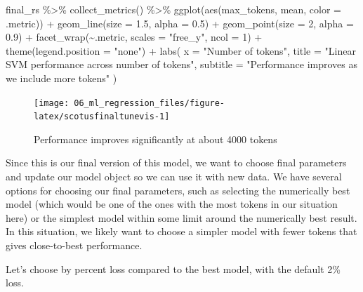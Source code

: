 \documentclass[
]{krantz}
\makeatletter
\newenvironment{Shaded}{\begin{snugshade}}{\end{snugshade}}
\newcommand{\AttributeTok}[1]{\textcolor[rgb]{0.77,0.63,0.00}{#1}}
\newcommand{\DecValTok}[1]{\textcolor[rgb]{0.00,0.00,0.81}{#1}}
\newcommand{\FloatTok}[1]{\textcolor[rgb]{0.00,0.00,0.81}{#1}}
\newcommand{\FunctionTok}[1]{\textcolor[rgb]{0.00,0.00,0.00}{#1}}
\newcommand{\NormalTok}[1]{#1}
\newcommand{\SpecialCharTok}[1]{\textcolor[rgb]{0.00,0.00,0.00}{#1}}
\newcommand{\StringTok}[1]{\textcolor[rgb]{0.31,0.60,0.02}{#1}}
\newenvironment{kframe}{%
\medskip{}
\setlength{\fboxsep}{.8em}
 \def\at@end@of@kframe{}%
 \ifinner\ifhmode%
  \def\at@end@of@kframe{\end{minipage}}%
  \begin{minipage}{\columnwidth}%
 \fi\fi%
 \def\FrameCommand##1{\hskip\@totalleftmargin \hskip-\fboxsep
 \colorbox{shadecolor}{##1}\hskip-\fboxsep
     \hskip-\linewidth \hskip-\@totalleftmargin \hskip\columnwidth}%
 \MakeFramed {\advance\hsize-\width
   \@totalleftmargin\z@ \linewidth\hsize
   \@setminipage}}%
 {\par\unskip\endMakeFramed%
 \at@end@of@kframe}
\renewenvironment{Shaded}{\begin{kframe}}{\end{kframe}}
\makeatother
\begin{document}
\begin{Shaded}
\begin{Highlighting}[]
\NormalTok{final\_rs }\SpecialCharTok{\%\textgreater{}\%}
  \FunctionTok{collect\_metrics}\NormalTok{() }\SpecialCharTok{\%\textgreater{}\%}
  \FunctionTok{ggplot}\NormalTok{(}\FunctionTok{aes}\NormalTok{(max\_tokens, mean, }\AttributeTok{color =}\NormalTok{ .metric)) }\SpecialCharTok{+}
  \FunctionTok{geom\_line}\NormalTok{(}\AttributeTok{size =} \FloatTok{1.5}\NormalTok{, }\AttributeTok{alpha =} \FloatTok{0.5}\NormalTok{) }\SpecialCharTok{+}
  \FunctionTok{geom\_point}\NormalTok{(}\AttributeTok{size =} \DecValTok{2}\NormalTok{, }\AttributeTok{alpha =} \FloatTok{0.9}\NormalTok{) }\SpecialCharTok{+}
  \FunctionTok{facet\_wrap}\NormalTok{(}\SpecialCharTok{\textasciitilde{}}\NormalTok{.metric, }\AttributeTok{scales =} \StringTok{"free\_y"}\NormalTok{, }\AttributeTok{ncol =} \DecValTok{1}\NormalTok{) }\SpecialCharTok{+}
  \FunctionTok{theme}\NormalTok{(}\AttributeTok{legend.position =} \StringTok{"none"}\NormalTok{) }\SpecialCharTok{+}
  \FunctionTok{labs}\NormalTok{(}
    \AttributeTok{x =} \StringTok{"Number of tokens"}\NormalTok{,}
    \AttributeTok{title =} \StringTok{"Linear SVM performance across number of tokens"}\NormalTok{,}
    \AttributeTok{subtitle =} \StringTok{"Performance improves as we include more tokens"}
\NormalTok{  )}
\end{Highlighting}
\end{Shaded}

\begin{figure}

{\centering \texttt{[image: 06\_ml\_regression\_files/figure-latex/scotusfinaltunevis-1]} 

}

\caption{Performance improves significantly at about 4000 tokens}\label{fig:scotusfinaltunevis}
\end{figure}

Since this is our final version of this model, we want to choose final parameters and update our model object so we can use it with new data. We have several options for choosing our final parameters, such as selecting the numerically best model (which would be one of the ones with the most tokens in our situation here) or the simplest model within some limit around the numerically best result. In this situation, we likely want to choose a simpler model with fewer tokens that gives close-to-best performance.

Let's choose by percent loss compared to the best model, with the default 2\% loss.
\end{document}
